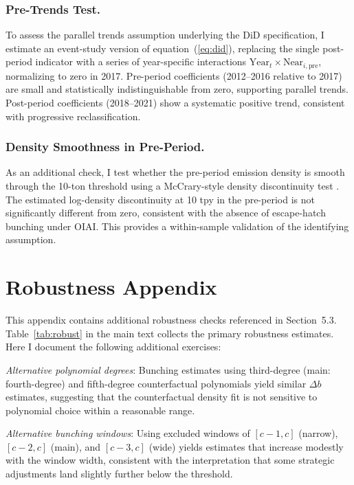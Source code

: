 \documentclass[12pt]{article}
\begin{document}
\subsubsection*{Pre-Trends Test.}
To assess the parallel trends assumption underlying the DiD specification, I estimate an event-study version of equation~(\ref{eq:did}), replacing the single post-period indicator with a series of year-specific interactions $\text{Year}_t \times \text{Near}_{i,\text{pre}}$, normalizing to zero in 2017. Pre-period coefficients (2012--2016 relative to 2017) are small and statistically indistinguishable from zero, supporting parallel trends. Post-period coefficients (2018--2021) show a systematic positive trend, consistent with progressive reclassification.

\subsubsection*{Density Smoothness in Pre-Period.}
As an additional check, I test whether the pre-period emission density is smooth through the 10-ton threshold using a McCrary-style density discontinuity test \citep{McCrary2008}. The estimated log-density discontinuity at 10 tpy in the pre-period is not significantly different from zero, consistent with the absence of escape-hatch bunching under OIAI. This provides a within-sample validation of the identifying assumption.

\section{Robustness Appendix}
\label{sec:robustness_appendix}

This appendix contains additional robustness checks referenced in Section~5.3. Table~\ref{tab:robust} in the main text collects the primary robustness estimates. Here I document the following additional exercises:

\textit{Alternative polynomial degrees}: Bunching estimates using third-degree (main: fourth-degree) and fifth-degree counterfactual polynomials yield similar $\Delta b$ estimates, suggesting that the counterfactual density fit is not sensitive to polynomial choice within a reasonable range.

\textit{Alternative bunching windows}: Using excluded windows of $[c-1, c]$ (narrow), $[c-2, c]$ (main), and $[c-3, c]$ (wide) yields estimates that increase modestly with the window width, consistent with the interpretation that some strategic adjustments land slightly further below the threshold.
\end{document}
